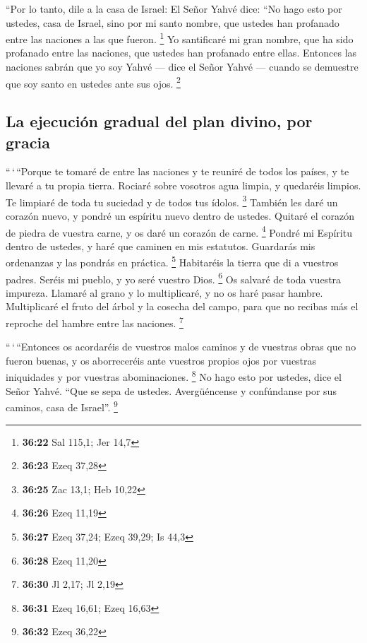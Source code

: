 \begin{paracol}{2}
 ``Por lo tanto, dile a la casa de Israel: El Señor Yahvé
dice: ``No hago esto por ustedes, casa de Israel, sino por mi santo
nombre, que ustedes han profanado entre las naciones a las que fueron.
\footnote{\textbf{36:22} Sal 115,1; Jer 14,7}  Yo
santificaré mi gran nombre, que ha sido profanado entre las naciones,
que ustedes han profanado entre ellas. Entonces las naciones sabrán que
yo soy Yahvé --- dice el Señor Yahvé --- cuando se demuestre que soy
santo en ustedes ante sus ojos. \footnote{\textbf{36:23} Ezeq 37,28}

\hypertarget{la-ejecuciuxf3n-gradual-del-plan-divino-por-gracia}{%
\subsection{La ejecución gradual del plan divino, por
gracia}\label{la-ejecuciuxf3n-gradual-del-plan-divino-por-gracia}}

 ``\,`\,``Porque te tomaré de entre las naciones y te
reuniré de todos los países, y te llevaré a tu propia tierra.
 Rociaré sobre vosotros agua limpia, y quedaréis limpios.
Te limpiaré de toda tu suciedad y de todos tus ídolos. \footnote{\textbf{36:25}
  Zac 13,1; Heb 10,22}  También les daré un corazón
nuevo, y pondré un espíritu nuevo dentro de ustedes. Quitaré el corazón
de piedra de vuestra carne, y os daré un corazón de carne. \footnote{\textbf{36:26}
  Ezeq 11,19}  Pondré mi Espíritu dentro de ustedes, y
haré que caminen en mis estatutos. Guardarás mis ordenanzas y las
pondrás en práctica. \footnote{\textbf{36:27} Ezeq 37,24; Ezeq 39,29; Is
  44,3}  Habitaréis la tierra que di a vuestros padres.
Seréis mi pueblo, y yo seré vuestro Dios. \footnote{\textbf{36:28} Ezeq
  11,20}  Os salvaré de toda vuestra impureza. Llamaré al
grano y lo multiplicaré, y no os haré pasar hambre. 
Multiplicaré el fruto del árbol y la cosecha del campo, para que no
recibas más el reproche del hambre entre las naciones. \footnote{\textbf{36:30}
  Jl 2,17; Jl 2,19}

 ``\,`\,``Entonces os acordaréis de vuestros malos
caminos y de vuestras obras que no fueron buenas, y os aborreceréis ante
vuestros propios ojos por vuestras iniquidades y por vuestras
abominaciones. \footnote{\textbf{36:31} Ezeq 16,61; Ezeq 16,63}
 No hago esto por ustedes, dice el Señor Yahvé. ``Que se
sepa de ustedes. Avergüéncense y confúndanse por sus caminos, casa de
Israel''. \footnote{\textbf{36:32} Ezeq 36,22}


\end{paracol}

